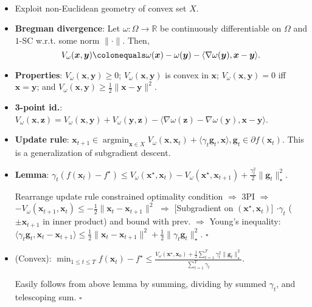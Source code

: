 \documentclass[8pt,a4paper]{extarticle}
\renewcommand{\proof}[1]{\begin{tcolorbox}#1 \hfill $\square$\end{tcolorbox}}
\DeclareMathOperator*{\argmin}{argmin}
\newcommand{\R}{\mathbb{R}}
\renewcommand{\vec}[1]{\bm{#1}}
\newenvironment{topic}[1]
{\textbf{\sffamily \colorbox{black}{\rlap{\textbf{\textcolor{white}{#1}}}\hspace{\linewidth}\hspace{-2\fboxsep}}} \\ \vspace{0.2cm}}
{}
\begin{document}
\begin{multicols*}{2}
    \begin{topic}{Mirror descent}
        \begin{itemize}
            \item Exploit non-Euclidean geometry of convex set $X$.
            \item \textbf{Bregman divergence}: Let $\omega: \Omega \to \R$ be continuously differentiable on $\Omega$ and $1$-SC w.r.t. some norm $\| \cdot \|$. Then, \[
                      V_{\omega}(\vec{x}, \vec{y}) \colonequals \omega(\vec{x}) - \omega(\vec{y}) - \langle \nabla \omega(\vec{y}), \vec{x} - \vec{y} \rangle.
                  \]
            \item \textbf{Properties}: $V_{\omega}(\vec{x}, \vec{y}) \geq 0$; $V_{\omega}(\vec{x}, \vec{y})$ is convex in $\vec{x}$; $V_{\omega}(\vec{x}, \vec{y}) = 0$ iff $\vec{x} = \vec{y}$; and $V_{\omega}(\vec{x}, \vec{y}) \geq \frac{1}{2} \| \vec{x} - \vec{y} \|^2$.
            \item \textbf{3-point id.}: $V_{\omega}(\vec{x}, \vec{z}) = V_{\omega}(\vec{x}, \vec{y}) + V_{\omega}(\vec{y}, \vec{z}) - \langle \nabla \omega(\vec{z}) - \nabla \omega(\vec{y}), \vec{x} - \vec{y} \rangle$.
            \item \textbf{Update rule}: $\vec{x}_{t+1} \in \argmin_{\vec{x} \in X} V_{\omega}(\vec{x}, \vec{x}_t) + \langle \gamma_t \vec{g}_t, \vec{x} \rangle, \vec{g}_t \in \partial f(\vec{x}_t)$. This is a generalization of subgradient descent.
            \item \textbf{Lemma}: $\gamma_t(f(\vec{x}_t) - f^\star) \leq V_{\omega}(\vec{x}^\star, \vec{x}_t) - V_{\omega}(\vec{x}^\star, \vec{x}_{t+1}) + \frac{\gamma_t^2}{2} \| \vec{g}_t \|_\star^2$.
                  \proof{Rearrange update rule constrained optimality condition $\Rightarrow$ 3PI $\Rightarrow$ $-V_{\omega}(\vec{x}_{t+1}, \vec{x}_t) \leq -\frac{1}{2}\| \vec{x}_t - \vec{x}_{t+1} \|^2$ $\Rightarrow$ [Subgradient on $(\vec{x}^\star, \vec{x}_t)$] $\cdot \gamma_t$ ($\pm \vec{x}_{t+1}$ in inner product) and bound with prev. $\Rightarrow$ Young's inequality: $\langle \gamma_t \vec{g}_t, \vec{x}_t - \vec{x}_{t+1} \rangle \leq \frac{1}{2} \| \vec{x}_t - \vec{x}_{t+1} \|^2 + \frac{1}{2} \| \gamma_t \vec{g}_t \|^2_\star$.}
            \item (Convex): $\min_{1\leq t\leq T} f(\vec{x}_t) - f^\star \leq \frac{V_{\omega}(\vec{x}^\star, \vec{x}_0) + \frac{1}{2} \sum_{t=1}^{T} \gamma_t^2 \| \vec{g}_t \|_\star^2}{\sum_{t=1}^{T} \gamma_t}$.
                  \proof{Easily follows from above lemma by summing, dividing by summed $\gamma_t$, and telescoping sum.}
        \end{itemize}
    \end{topic}


\end{multicols*}
\end{document}
